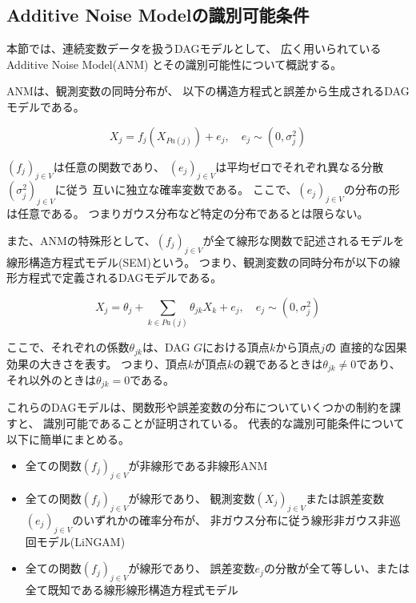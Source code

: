 
\subsection{Additive Noise Modelの識別可能条件}

本節では、連続変数データを扱うDAGモデルとして、
広く用いられているAdditive Noise Model(ANM)
\cite{Shimizu2006-yu}
\cite{Hoyer2008-oo}
\cite{Peters2013-eb}
\cite{Peters2014-ro}
\cite{Park2020-ey}
とその識別可能性について概説する。

ANMは、観測変数の同時分布が、
以下の構造方程式と誤差から生成されるDAGモデルである。

\begin{equation}
  X_j = f_j(X_{Pa(j)}) + e_j , \quad e_j \sim (0, \sigma_j^2)
  \label{def:ANM}
\end{equation}

$(f_j)_{j\in V}$は任意の関数であり、
$(e_j)_{j\in V}$は平均ゼロでそれぞれ異なる分散$(\sigma_j^2)_{j\in V}$に従う
互いに独立な確率変数である。
ここで、$(e_j)_{j\in V}$の分布の形は任意である。
つまりガウス分布など特定の分布であるとは限らない。

また、ANMの特殊形として、$(f_j)_{j\in V}$が全て線形な関数で記述されるモデルを
線形構造方程式モデル(SEM)という。
つまり、観測変数の同時分布が以下の線形方程式で定義されるDAGモデルである。

\begin{equation}
  X_j = \theta_j + \sum_{k \in Pa(j)} \theta_{jk} X_k + e_j, \quad e_j \sim (0, \sigma_j^2)
\end{equation}

ここで、それぞれの係数$\theta_{jk}$は、DAG $G$における頂点$k$から頂点$j$の
直接的な因果効果の大きさを表す。
つまり、頂点$k$が頂点$k$の親であるときは$\theta_{jk} \neq 0$であり、
それ以外のときは$\theta_{jk}=0$である。

これらのDAGモデルは、関数形や誤差変数の分布についていくつかの制約を課すと、
識別可能であることが証明されている。
代表的な識別可能条件について以下に簡単にまとめる。

\begin{itemize}
  \item
  全ての関数$(f_j)_{j \in V}$が非線形である非線形ANM\cite{Hoyer2008-oo}

  \item
  全ての関数$(f_j)_{j \in V}$が線形であり、
  観測変数$(X_j)_{j \in V}$または誤差変数$(e_j)_{j\in V}$のいずれかの確率分布が、
  非ガウス分布に従う線形非ガウス非巡回モデル(LiNGAM)\cite{Shimizu2006-yu}

  \item
  全ての関数$(f_j)_{j \in V}$が線形であり、
  誤差変数$e_j$の分散が全て等しい、または全て既知である線形線形構造方程式モデル\cite{Peters2013-eb}
\end{itemize}

